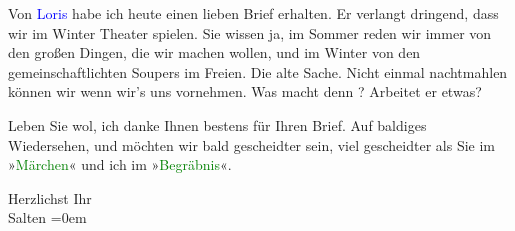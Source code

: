 \pstart
           Von \textcolor{blue}{Loris}{}\ledrightnote{\textcolor{blue}{Hugo von Hofmannsthal}} habe ich heute einen lieben Brief erhalten. Er verlangt dringend, dass wir im
               Winter Theater spielen. Sie wissen ja, im Sommer reden wir immer von den großen
               Dingen, die wir machen wollen, und im Winter von den gemeinschaftlichten Soupers im
               Freien. Die alte Sache. Nicht einmal nachtmahlen können wir wenn wir’s uns vornehmen.\hspace*{2.5em}
               Was macht denn \label{K_L03123-7v}\label{K_L03123-7h}? Arbeitet er etwas?\pend
           
\pstart
           Leben Sie wol, ich danke Ihnen bestens für Ihren Brief. Auf baldiges Wiedersehen, und
               möchten wir bald gescheidter sein, viel gescheidter als Sie im »\textcolor{green}{Märchen}{}\ledrightnote{\textcolor{green}{Das Märchen. Schauspiel in drei Aufzügen}}« und ich im »\textcolor{green}{Begräbnis}{}\ledrightnote{\textcolor{green}{Begräbnis}}«.\pend
           
\pstart
           Herzlichst Ihr{\\[\baselineskip]}\spacefill\mbox{Salten}\pend
           \leftskip=0em{}\endnumbering{}  
      